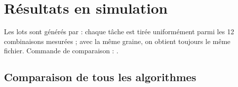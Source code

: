 \section{Résultats en simulation}
\label{sec:simu}

\begin{center}
\end{center}

Les lots sont générés par  : chaque tâche est
tirée uniformément parmi les 12 combinaisons mesurées ; avec la même graine, on
obtient toujours le même fichier. Commande de comparaison :
.

\subsection{Comparaison de tous les algorithmes}

